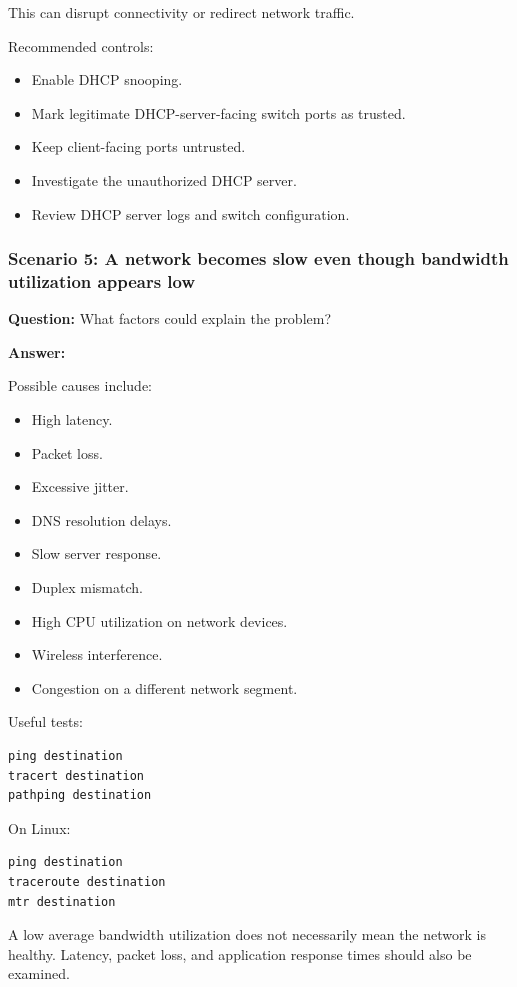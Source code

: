 This can disrupt connectivity or redirect network traffic.

Recommended controls:

\begin{itemize}
\item Enable DHCP snooping.
\item Mark legitimate DHCP-server-facing switch ports as trusted.
\item Keep client-facing ports untrusted.
\item Investigate the unauthorized DHCP server.
\item Review DHCP server logs and switch configuration.
\end{itemize}

\subsubsection*{Scenario 5: A network becomes slow even though bandwidth utilization appears low}

\textbf{Question:} What factors could explain the problem?

\textbf{Answer:}

Possible causes include:

\begin{itemize}
\item High latency.
\item Packet loss.
\item Excessive jitter.
\item DNS resolution delays.
\item Slow server response.
\item Duplex mismatch.
\item High CPU utilization on network devices.
\item Wireless interference.
\item Congestion on a different network segment.
\end{itemize}

Useful tests:

\begin{lstlisting}
ping destination
tracert destination
pathping destination
\end{lstlisting}

On Linux:

\begin{lstlisting}
ping destination
traceroute destination
mtr destination
\end{lstlisting}

A low average bandwidth utilization does not necessarily mean the network is healthy. Latency, packet loss, and application response times should also be examined.


